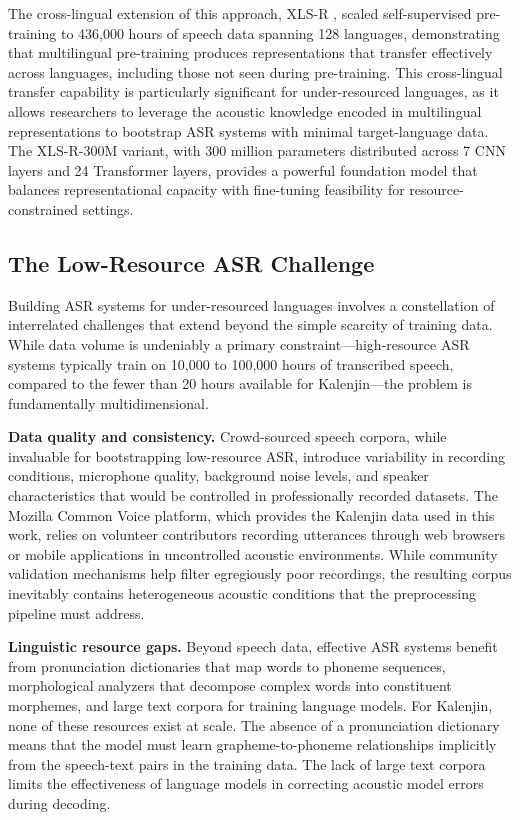 \documentclass[12pt,a4paper]{article}
\begin{document}
The cross-lingual extension of this approach, XLS-R \citep{babu2022xls}, scaled self-supervised pre-training to 436,000 hours of speech data spanning 128 languages, demonstrating that multilingual pre-training produces representations that transfer effectively across languages, including those not seen during pre-training. This cross-lingual transfer capability is particularly significant for under-resourced languages, as it allows researchers to leverage the acoustic knowledge encoded in multilingual representations to bootstrap ASR systems with minimal target-language data. The XLS-R-300M variant, with 300 million parameters distributed across 7 CNN layers and 24 Transformer layers, provides a powerful foundation model that balances representational capacity with fine-tuning feasibility for resource-constrained settings.

\subsection{The Low-Resource ASR Challenge}

Building ASR systems for under-resourced languages involves a constellation of interrelated challenges that extend beyond the simple scarcity of training data. While data volume is undeniably a primary constraint---high-resource ASR systems typically train on 10,000 to 100,000 hours of transcribed speech, compared to the fewer than 20 hours available for Kalenjin---the problem is fundamentally multidimensional.

\textbf{Data quality and consistency.} Crowd-sourced speech corpora, while invaluable for bootstrapping low-resource ASR, introduce variability in recording conditions, microphone quality, background noise levels, and speaker characteristics that would be controlled in professionally recorded datasets. The Mozilla Common Voice platform, which provides the Kalenjin data used in this work, relies on volunteer contributors recording utterances through web browsers or mobile applications in uncontrolled acoustic environments. While community validation mechanisms help filter egregiously poor recordings, the resulting corpus inevitably contains heterogeneous acoustic conditions that the preprocessing pipeline must address.

\textbf{Linguistic resource gaps.} Beyond speech data, effective ASR systems benefit from pronunciation dictionaries that map words to phoneme sequences, morphological analyzers that decompose complex words into constituent morphemes, and large text corpora for training language models. For Kalenjin, none of these resources exist at scale. The absence of a pronunciation dictionary means that the model must learn grapheme-to-phoneme relationships implicitly from the speech-text pairs in the training data. The lack of large text corpora limits the effectiveness of language models in correcting acoustic model errors during decoding.
\end{document}
